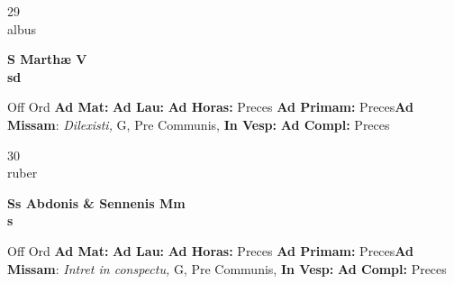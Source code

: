 \documentclass[10pt, openany]{book}
\begin{document}
    \begin{center}
        \begin{minipage}{3.5in}
            \vspace{2em}
            \begin{minipage}{0.5in}
                {\Huge 29} \\
                {\normalsize albus}
            \end{minipage}
            \begin{minipage}{3.0in}
                \textbf{ \large S Marthæ V \\
                \textnormal{\normalsize sd}}

            \end{minipage}
            \begin{justify}Off Ord
                \textbf{Ad Mat: }
                \textbf{Ad Lau: }
                \textbf{Ad Horas: }Preces
                \textbf{Ad Primam: }Preces\textbf{Ad Missam}: \textit{Dilexisti,} G, Pre Communis, 
                \textbf{In Vesp: }
                \textbf{Ad Compl: }Preces
            \end{justify}
        \end{minipage}
    \end{center}

    \begin{center}
        \begin{minipage}{3.5in}
            \vspace{2em}
            \begin{minipage}{0.5in}
                {\Huge 30} \\
                {\normalsize ruber}
            \end{minipage}
            \begin{minipage}{3.0in}
                \textbf{ \large Ss Abdonis \& Sennenis Mm \\
                \textnormal{\normalsize s}}

            \end{minipage}
            \begin{justify}Off Ord
                \textbf{Ad Mat: }
                \textbf{Ad Lau: }
                \textbf{Ad Horas: }Preces
                \textbf{Ad Primam: }Preces\textbf{Ad Missam}: \textit{Intret in conspectu,} G, Pre Communis, 
                \textbf{In Vesp: }
                \textbf{Ad Compl: }Preces
            \end{justify}
        \end{minipage}
    \end{center}
\end{document}
